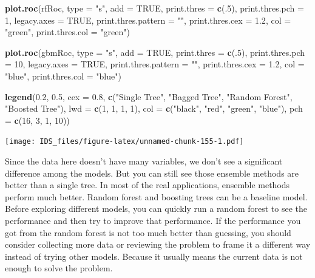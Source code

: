 \documentclass[12pt,]{krantz}
\makeatletter
\newenvironment{Shaded}{\begin{snugshade}}{\end{snugshade}}
\newcommand{\DataTypeTok}[1]{\textcolor[rgb]{0.27,0.27,0.27}{#1}}
\newcommand{\DecValTok}[1]{\textcolor[rgb]{0.06,0.06,0.06}{#1}}
\newcommand{\FloatTok}[1]{\textcolor[rgb]{0.06,0.06,0.06}{#1}}
\newcommand{\KeywordTok}[1]{\textcolor[rgb]{0.27,0.27,0.27}{\textbf{#1}}}
\newcommand{\NormalTok}[1]{#1}
\newcommand{\OtherTok}[1]{\textcolor[rgb]{0.37,0.37,0.37}{#1}}
\newcommand{\StringTok}[1]{\textcolor[rgb]{0.5,0.5,0.5}{#1}}
\newenvironment{kframe}{%
\medskip{}
\setlength{\fboxsep}{.8em}
 \def\at@end@of@kframe{}%
 \ifinner\ifhmode%
  \def\at@end@of@kframe{\end{minipage}}%
  \begin{minipage}{\columnwidth}%
 \fi\fi%
 \def\FrameCommand##1{\hskip\@totalleftmargin \hskip-\fboxsep
 \colorbox{shadecolor}{##1}\hskip-\fboxsep
     \hskip-\linewidth \hskip-\@totalleftmargin \hskip\columnwidth}%
 \MakeFramed {\advance\hsize-\width
   \@totalleftmargin\z@ \linewidth\hsize
   \@setminipage}}%
 {\par\unskip\endMakeFramed%
 \at@end@of@kframe}
\renewenvironment{Shaded}{\begin{kframe}}{\end{kframe}}
\makeatother
\begin{document}
\begin{Shaded}
\begin{Highlighting}[]
\KeywordTok{plot.roc}\NormalTok{(rfRoc, }
     \DataTypeTok{type =} \StringTok{"s"}\NormalTok{, }
     \DataTypeTok{add =} \OtherTok{TRUE}\NormalTok{, }
     \DataTypeTok{print.thres =} \KeywordTok{c}\NormalTok{(.}\DecValTok{5}\NormalTok{), }\DataTypeTok{print.thres.pch =} \DecValTok{1}\NormalTok{, }
     \DataTypeTok{legacy.axes =} \OtherTok{TRUE}\NormalTok{, }\DataTypeTok{print.thres.pattern =} \StringTok{""}\NormalTok{, }
     \DataTypeTok{print.thres.cex =} \FloatTok{1.2}\NormalTok{,}
     \DataTypeTok{col =} \StringTok{"green"}\NormalTok{, }\DataTypeTok{print.thres.col =} \StringTok{"green"}\NormalTok{)}

\KeywordTok{plot.roc}\NormalTok{(gbmRoc, }
     \DataTypeTok{type =} \StringTok{"s"}\NormalTok{, }
     \DataTypeTok{add =} \OtherTok{TRUE}\NormalTok{, }
     \DataTypeTok{print.thres =} \KeywordTok{c}\NormalTok{(.}\DecValTok{5}\NormalTok{), }\DataTypeTok{print.thres.pch =} \DecValTok{10}\NormalTok{, }
     \DataTypeTok{legacy.axes =} \OtherTok{TRUE}\NormalTok{, }\DataTypeTok{print.thres.pattern =} \StringTok{""}\NormalTok{, }
     \DataTypeTok{print.thres.cex =} \FloatTok{1.2}\NormalTok{,}
     \DataTypeTok{col =} \StringTok{"blue"}\NormalTok{, }\DataTypeTok{print.thres.col =} \StringTok{"blue"}\NormalTok{)}

\KeywordTok{legend}\NormalTok{(}\FloatTok{0.2}\NormalTok{, }\FloatTok{0.5}\NormalTok{, }\DataTypeTok{cex =} \FloatTok{0.8}\NormalTok{,}
       \KeywordTok{c}\NormalTok{(}\StringTok{"Single Tree"}\NormalTok{, }\StringTok{"Bagged Tree"}\NormalTok{, }
         \StringTok{"Random Forest"}\NormalTok{, }\StringTok{"Boosted Tree"}\NormalTok{),}
       \DataTypeTok{lwd =} \KeywordTok{c}\NormalTok{(}\DecValTok{1}\NormalTok{, }\DecValTok{1}\NormalTok{, }\DecValTok{1}\NormalTok{, }\DecValTok{1}\NormalTok{),}
       \DataTypeTok{col =} \KeywordTok{c}\NormalTok{(}\StringTok{"black"}\NormalTok{, }\StringTok{"red"}\NormalTok{, }\StringTok{"green"}\NormalTok{, }\StringTok{"blue"}\NormalTok{),}
       \DataTypeTok{pch =} \KeywordTok{c}\NormalTok{(}\DecValTok{16}\NormalTok{, }\DecValTok{3}\NormalTok{, }\DecValTok{1}\NormalTok{, }\DecValTok{10}\NormalTok{))}
\end{Highlighting}
\end{Shaded}

\texttt{[image: IDS\_files/figure-latex/unnamed-chunk-155-1.pdf]}

Since the data here doesn't have many variables, we don't see a significant difference among the models. But you can still see those ensemble methods are better than a single tree. In most of the real applications, ensemble methods perform much better. Random forest and boosting trees can be a baseline model. Before exploring different models, you can quickly run a random forest to see the performance and then try to improve that performance. If the performance you got from the random forest is not too much better than guessing, you should consider collecting more data or reviewing the problem to frame it a different way instead of trying other models. Because it usually means the current data is not enough to solve the problem.
\end{document}
